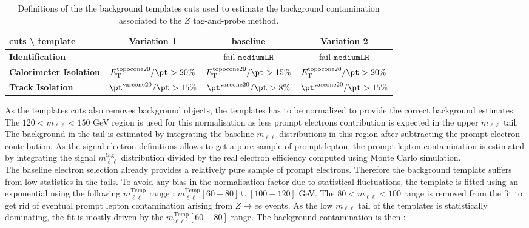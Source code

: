 \begin{table}[htb!]
        \begin{center}
        \begin{tabular}{|l|c|c|c|}
        \hline 
        \textbf{cuts \textbackslash{} template} & \textbf{Variation 1} & \textbf{baseline} & \textbf{Variation 2}\tabularnewline
        \hline 
        \hline 
        \textbf{Identification} & - & fail $\texttt{mediumLH}$ & fail $\texttt{mediumLH}$\tabularnewline
        \hline 
        \textbf{Calorimeter Isolation} & $E_{\mathrm{T}}^{\mathrm{topocone20}}/\pt>20\%$  & $E_{\mathrm{T}}^{\mathrm{topocone20}}/\pt>15\%$ & $E_{\mathrm{T}}^{\mathrm{topocone20}}/\pt>20\%$\tabularnewline
        \hline 
        \textbf{Track Isolation} & $\pt^{\mathrm{varcone20}}/\pt>15\%$ & $\pt^{\mathrm{varcone20}}/\pt>8\%$ & $\pt^{\mathrm{varcone20}}/\pt>15\%$\tabularnewline
        \hline 
        \end{tabular}
        \caption{\label{tab:bkg_templates_def} Definitions of the the background templates cuts used to estimate the background contamination associated to the $Z$ tag-and-probe method.} 
        \end{center}
\end{table}

 As the templates cuts also removes background objects, the templates has to be normalized to provide the correct background estimates. The $120 < m_{\ell\ell} < 150$ GeV region is used for this normalisation as less prompt electrons contribution is expected in the upper $m_{\ell\ell}$ tail. The background in the tail is estimated by integrating the baseline $m_{\ell\ell}$ distributions in this region after subtracting the prompt electron contribution. As the signal electron definitions allows to get a pure sample of prompt lepton, the prompt lepton contamination is estimated by integrating the signal $m_{\ell\ell}^{\mathrm{Sig}}$ distribution divided by the real electron efficiency computed using Monte Carlo simulation. \\
    The baseline electron selection already provides a relatively pure sample of prompt electrons. Therefore the background template suffers from low statistics in the tails. To avoid any bias in the normalisation factor due to statistical fluctuations, the template is fitted using an exponential using the following $m_{\ell\ell}^{\mathrm{Temp}}$ range : $m_{\ell\ell}^{\mathrm{Temp}} [60-80]\cup[100-120]$ GeV. The $80 < m_{\ell\ell} < 100$ range is removed from the fit to get rid of eventual prompt lepton contamination arising from $Z\rightarrow ee$ events. As the low $m_{\ell\ell}$ tail of the templates is statistically dominating, the fit is mostly driven by the $m_{\ell\ell}^{\mathrm{Temp}} [60-80]$ range. The background contamination is then :

